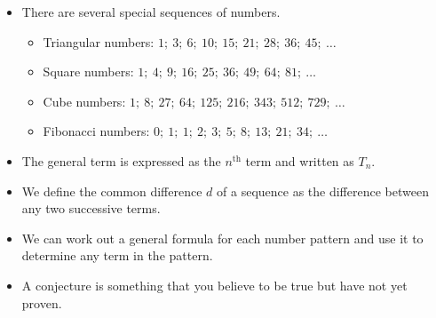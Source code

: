 \begin{itemize}[noitemsep]
\item There are several special sequences of numbers.
    \begin{itemize}[noitemsep]
    \item Triangular numbers: $1;~3;~6;~10;~15;~21;~28;~36;~45;~\ldots$
    \item Square numbers: $1;~4;~9;~16;~25;~36;~49;~64;~81;~\ldots$
    \item Cube numbers: $1;~8;~27;~64;~125;~216;~343;~512;~729;~\ldots$
    \item Fibonacci numbers: $0;~1;~1;~2;~3;~5;~8;~13;~21;~34;~\ldots$
    \end{itemize}
\item The general term is expressed as the ${n}^{\mathrm{th}}$ term and written as ${T}_{n}$.
\item We define the common difference $d$ of a sequence as the difference between any two successive terms.
\item We can work out a general formula for each number pattern and use it to determine any term in the pattern.
\item A conjecture is something that you believe to be true but have not yet proven.
\end{itemize}
            

